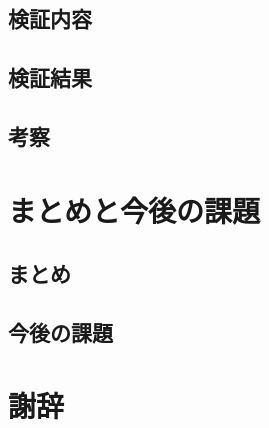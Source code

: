 \documentclass[platex]{suribt}
\begin{document}
\section{検証内容}
\section{検証結果}
\section{考察}

\chapter{まとめと今後の課題}
\section{まとめ}
\section{今後の課題}

\backmatter%
\chapter{謝辞}%
\end{document}
